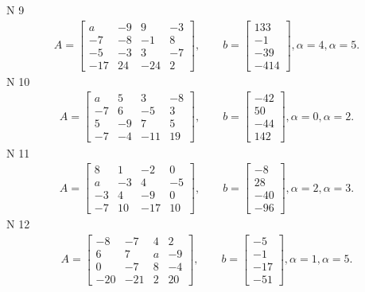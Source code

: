 \documentclass[11pt]{report}
\begin{document}
N 9
\begin{align*}
 A = \left[\begin{matrix}a & -9 & 9 & -3\\-7 & -8 & -1 & 8\\-5 & -3 & 3 & -7\\-17 & 24 & -24 & 2\end{matrix}\right],
    \qquad b = \left[\begin{matrix}133\\-1\\-39\\-414\end{matrix}\right], \alpha = 4, \alpha = 5. 
 \end{align*}
N 10
\begin{align*}
 A = \left[\begin{matrix}a & 5 & 3 & -8\\-7 & 6 & -5 & 3\\5 & -9 & 7 & 5\\-7 & -4 & -11 & 19\end{matrix}\right],
    \qquad b = \left[\begin{matrix}-42\\50\\-44\\142\end{matrix}\right], \alpha = 0, \alpha = 2. 
 \end{align*}
N 11
\begin{align*}
 A = \left[\begin{matrix}8 & 1 & -2 & 0\\a & -3 & 4 & -5\\-3 & 4 & -9 & 0\\-7 & 10 & -17 & 10\end{matrix}\right],
    \qquad b = \left[\begin{matrix}-8\\28\\-40\\-96\end{matrix}\right], \alpha = 2, \alpha = 3. 
 \end{align*}
N 12
\begin{align*}
 A = \left[\begin{matrix}-8 & -7 & 4 & 2\\6 & 7 & a & -9\\0 & -7 & 8 & -4\\-20 & -21 & 2 & 20\end{matrix}\right],
    \qquad b = \left[\begin{matrix}-5\\-1\\-17\\-51\end{matrix}\right], \alpha = 1, \alpha = 5. 
 \end{align*}
\end{document}
